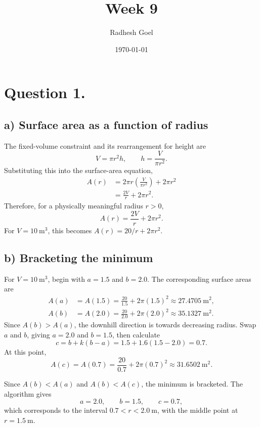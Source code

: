 \documentclass[a4paper]{exam}
\title{Week 9}
\author{Radhesh Goel}
\date{\today}
\begin{document}
\maketitle

\section*{Question 1.}

\subsection*{a) Surface area as a function of radius}

\begin{solution}
  The fixed-volume constraint and its rearrangement for height are
  \[
    V=\pi r^2h,
    \qquad
    h=\frac{V}{\pi r^2}.
  \]
  Substituting this into the surface-area equation,
  \[
    \begin{aligned}
      A(r)
      &=2\pi r\left(\frac{V}{\pi r^2}\right)+2\pi r^2 \\
      &=\frac{2V}{r}+2\pi r^2.
    \end{aligned}
  \]
  Therefore, for a physically meaningful radius \(r>0\),
  \[
    \boxed{A(r)=\frac{2V}{r}+2\pi r^2}.
  \]
  For \(V=10\ \mathrm{m^3}\), this becomes
  \(A(r)=20/r+2\pi r^2\).
\end{solution}

\subsection*{b) Bracketing the minimum}

\begin{solution}
  For \(V=10\ \mathrm{m^3}\), begin with \(a=1.5\) and \(b=2.0\). The
  corresponding surface areas are
  \[
    \begin{aligned}
      A(a)&=A(1.5)=\frac{20}{1.5}+2\pi(1.5)^2
            \approx 27.4705\ \mathrm{m^2},\\
      A(b)&=A(2.0)=\frac{20}{2.0}+2\pi(2.0)^2
            \approx 35.1327\ \mathrm{m^2}.
    \end{aligned}
  \]
  Since \(A(b)>A(a)\), the downhill direction is towards decreasing radius.
  Swap \(a\) and \(b\), giving \(a=2.0\) and \(b=1.5\), then calculate
  \[
    c=b+k(b-a)
      =1.5+1.6(1.5-2.0)
      =0.7.
  \]
  At this point,
  \[
    A(c)=A(0.7)=\frac{20}{0.7}+2\pi(0.7)^2
         \approx 31.6502\ \mathrm{m^2}.
  \]
  \par\noindent
  Since \(A(b)<A(a)\) and \(A(b)<A(c)\), the minimum is bracketed. The
  algorithm gives
  \[
    \boxed{a=2.0,\qquad b=1.5,\qquad c=0.7},
  \]
  which corresponds to the interval \(0.7<r<2.0\ \mathrm{m}\), with the
  middle point at \(r=1.5\ \mathrm{m}\).
\end{solution}
\end{document}
